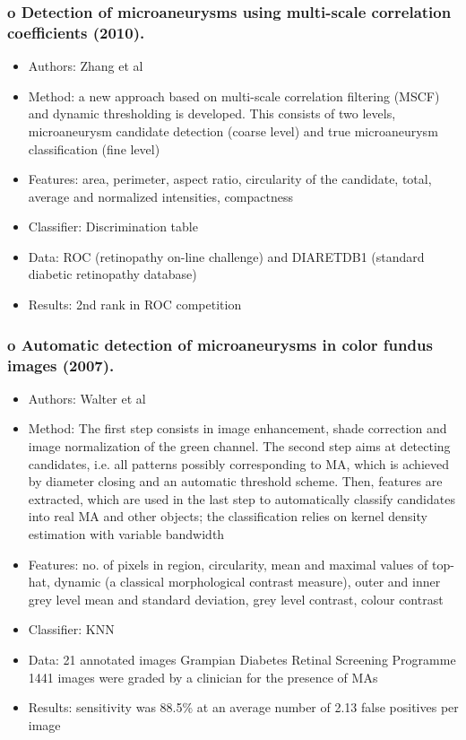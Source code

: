 \documentclass[12pt]{report}
\begin{document}
\subsubsection{o  Detection of microaneurysms using multi-scale correlation coefficients (2010). \cite{zhang2010detection}}
\begin{itemize}
\item Authors: Zhang et al
\item Method: a new approach based on multi-scale correlation filtering (MSCF) and dynamic thresholding is developed. This consists of two levels, microaneurysm candidate detection (coarse level) and true microaneurysm classification (fine level)
\item Features: area, perimeter, aspect ratio, circularity of the candidate, total, average and normalized intensities, compactness
\item Classifier: Discrimination table
\item Data: ROC (retinopathy on-line challenge) and DIARETDB1 (standard diabetic retinopathy database)
\item Results: 2nd rank in ROC competition
\end{itemize}


\subsubsection{o   Automatic detection of microaneurysms in color fundus images (2007). \cite{walter2007automatic}}
\begin{itemize}
\item Authors: Walter et al
\item Method: The first step consists in image enhancement, shade correction and image normalization of the green channel. The second step aims at detecting candidates, i.e. all patterns possibly corresponding to MA, which is achieved by diameter closing and an automatic threshold scheme. Then, features are extracted, which are used in the last step to automatically classify candidates into real MA and other objects; the classification relies on kernel density estimation with variable bandwidth
\item Features: no. of pixels in region, circularity, mean and maximal values of top-hat, dynamic (a classical morphological contrast measure), outer and inner grey level mean and standard deviation, grey level contrast, colour contrast
\item Classifier: KNN
\item Data: 21 annotated images Grampian Diabetes Retinal Screening Programme 1441 images were graded by a clinician for the presence of MAs
\item Results: sensitivity was 88.5\% at an average number of 2.13 false positives per image
\end{itemize}
\end{document}
